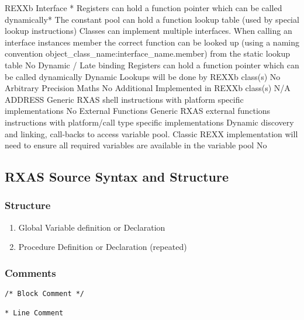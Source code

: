 \textbar{} REXXb Interface \textbar{} * Registers can hold a function pointer which can be called dynamically* The constant pool can hold a function lookup table (used by special lookup instructions) \textbar{} Classes can implement multiple interfaces. When calling an interface instance\textquotesingle{}s member the correct function can be looked up (using a naming convention \textquotedbl{}object\_class\_name:interface\_name.member\textquotedbl{}) from the static lookup table \textbar{} No \textbar{}
\textbar{} Dynamic / Late binding \textbar{} Registers can hold a function pointer which can be called dynamically \textbar{} Dynamic Lookups will be done by REXXb class(s) \textbar{} No \textbar{}
\textbar{} Arbitrary Precision Maths \textbar{} No Additional \textbar{} Implemented in REXXb class(s) \textbar{} N/A \textbar{}
\textbar{} ADDRESS \textbar{} Generic RXAS shell instructions with platform specific implementations \textbar{} \textbar{} No \textbar{}
\textbar{} External Functions \textbar{} Generic RXAS external functions instructions with platform/call type specific implementations \textbar{} Dynamic discovery and linking, call-backs to access variable pool. Classic REXX implementation will need to ensure all required variables are available in the variable pool \textbar{} No \textbar{}

\subsection{RXAS Source Syntax and Structure}

\subsubsection{Structure}

\begin{enumerate}
\item Global Variable definition or Declaration

\item Procedure Definition or Declaration (repeated)

\end{enumerate}

\subsubsection{Comments}

\begin{verbatim}
/* Block Comment */

* Line Comment
\end{verbatim}

